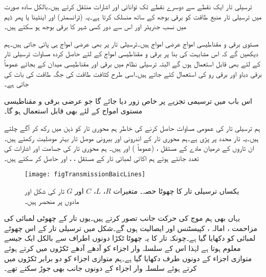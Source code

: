 ترسیلی تار ایک نقطے سے  دوسرے نقطے تک توانائی اور اشارات منتقل کرتے ہیں۔بالکل سادہ صورت میں ترسیلی تار منبع طاقت کو برقی بوجھ کے ساتھ منسلک کرتا ہے۔یہ  (ٹرانسمٹر)  اور اینٹینا یا پھر ڈیم میں نسب جنریٹر اور اس سے دور کسی شہر کا برقی بوجھ ہو سکتے ہیں۔

مستوی برقی و مقناطیسی امواج عرضی امواج ہیں۔ترسیلی تار پر بھی عرضی امواج ہی پائی جاتی ہیں۔ہم دیکھیں گے کہ اس مشابہت کی بنا پر برقی و مقناطیسی امواج کے لئے حاصل کردہ مساوات ترسیلی تار کے لئے بھی قابل استعمال ہوں گے البتہ ترسیلی نظام میں برقی اور مقناطیسی میدان کے بجائے عموماً برقی دباو اور برقی رو کی استعمال کئے جاتے ہیں۔اسی طرح کثافت طاقت کی جگہ طاقت کی بات کی جاتی ہے۔

اس باب میں ترسیمی تجزیے پر خاص زور  دیا جائے گا جو عرضی برقی و مقناطیسی مستوی امواج کے لئے بھی قابل استعمال ہو گا۔ 

ہم ترسیلی تار کی عمومی مساوات حاصل کرنے کی خاطر ہم محوری تار کو ذہن میں رکھ کر آگے چلتے ہیں۔یہ تار  محدد پر پڑی ہے۔ہم محوری تار کے اندرونی اور بیرونی موصل تار بہتر موصلیت  رکھتے ہیں۔ان تاروں کے درمیان  مادے کے مستقل ،  (عموماً ) اور  ہیں۔ 
ہم محوری تار کی جسامت اور اشارات کی تعدد جانتے ہوئے ہم اکائی لمبائی تار کے مستقل ، ،  اور  حاصل کر سکتے ہیں۔

\begin{figure}
\centering
\texttt{[image: figTransmissionBaicLines]}
\caption{یکساں ترسیلی تار کا چھوٹا حصہ۔ متغیرات $R$، $L$، $C$ اور $G$ تار کی شکل اور مادوں پر منحصر ہیں۔}
\label{شکل_ترسیل_سادہ_نظام}
\end{figure}

یہاں بھی ہم موج کی حرکت  جانب تصور کرتے ہیں۔یوں تار کے چھوٹی لمبائی  کی مزاحمت ، امالہ ، کپیسٹنس  اور ایصالیت  ہوں گے۔شکل  میں ترسیلی تار کے اس چھوٹے لمبائی کو دکھایا گیا ہے۔چونکہ تار کا یہ چھوٹا ٹکڑا دونوں اطراف سے بالکل ایک جیسے معلوم ہوتا ہے  لہٰذا اس کے سلسلہ وار اجزاء کو آدھے آدھے ٹکڑوں میں کرتے ہوئے متوازی اجزاء کے دونوں طرف دکھایا گیا ہے۔ہم متوازی اجزاء کو دو برابر ٹکڑوں میں کرتے ہوئے سلسلہ وار اجزاء کے دونوں جانب بھی جوڑ سکتے تھے۔

